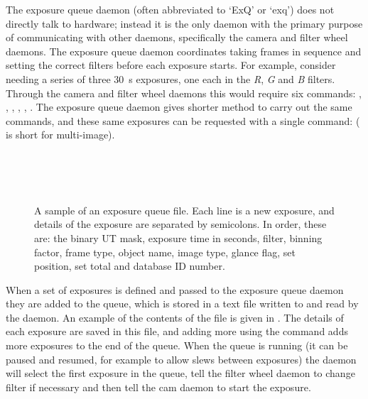 \begin{colsection}
\begin{colsection}
The exposure queue daemon (often abbreviated to `ExQ' or `exq') does not directly talk to hardware; instead it is the only daemon with the primary purpose of communicating with other daemons, specifically the camera and filter wheel daemons. The exposure queue daemon coordinates taking frames in sequence and setting the correct filters before each exposure starts. For example, consider needing a series of three \SI{30}{\second} exposures, one each in the \textit{R}, \textit{G} and \textit{B} filters. Through the camera and filter wheel daemons this would require six commands: , , , , , . The exposure queue daemon gives shorter method to carry out the same commands, and these same exposures can be requested with a single command:  ( is short for multi-image).

\begin{figure}[t]
    \begin{center}
        \vspace{1cm}
        \\
        \\
        \\
        \vspace{0cm}
    \end{center}
    \caption[A sample exposure queue file]{
        A sample of an exposure queue file. Each line is a new exposure, and details of the exposure are separated by semicolons. In order, these are: the binary UT mask, exposure time in seconds, filter, binning factor, frame type, object name, image type, glance flag, set position, set total and database ID number.
    }\label{fig:exq_file}
\end{figure}

When a set of exposures is defined and passed to the exposure queue daemon they are added to the queue, which is stored in a text file written to and read by the daemon. An example of the contents of the file is given in . The details of each exposure are saved in this file, and adding more using the  command adds more exposures to the end of the queue. When the queue is running (it can be paused and resumed, for example to allow slews between exposures) the daemon will select the first exposure in the queue, tell the filter wheel daemon to change filter if necessary and then tell the cam daemon to start the exposure.


\end{colsection}
\end{colsection}
